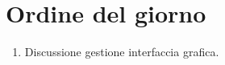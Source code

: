 \section{Ordine del giorno}

\begin{enumerate}
    \item Discussione gestione interfaccia grafica.
\end{enumerate}